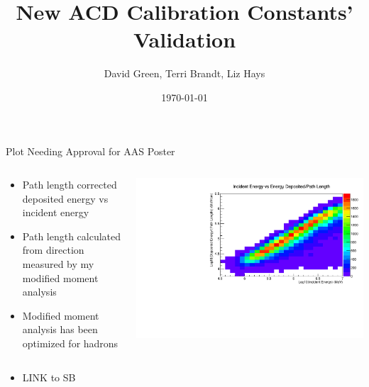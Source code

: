 \documentclass[10pt, table]{beamer}
\begin{document}
\title{New ACD Calibration Constants' Validation}   
\author{David Green, Terri Brandt, Liz Hays} 
\date{\today} 

\begin{frame}{Plot Needing Approval for AAS Poster}
     \begin{columns}[t] %
     \begin{column}[T]{0.35 \textwidth} %
      \begin{itemize}
     \item Path length corrected deposited energy vs incident energy
     \item Path length calculated from direction measured by my modified moment analysis
     \item Modified moment analysis has been optimized for hadrons
       \end{itemize}
     \end{column}
     \begin{column}[T]{0.75 \textwidth} %
          \includegraphics[width = \columnwidth]{CalEnergyRaw-CalFullLen_mom12}
     \end{column}
     \end{columns}
     
    \begin{itemize}
    \item LINK to SB
    \end{itemize}
\end{frame}

\end{document}
